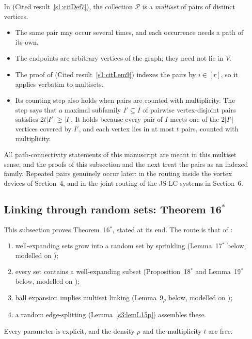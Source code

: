 \begin{remark}\label{s3:remMultiset}
In \cite[Definition~7]{BM} (Cited result~\ref{s1:citDef7}), the collection
$\mathcal P$ is a \emph{multiset} of pairs of distinct vertices.
\begin{itemize}
\item The same pair may occur several times, and each occurrence needs a
  path of its own.
\item The endpoints are arbitrary vertices of the graph; they need not
  lie in $V$.
\item The proof of \cite[Lemma~9]{BM} (Cited result~\ref{s1:citLem9}) indexes
  the pairs by $i\in[r]$, so it applies verbatim to multisets.
\item Its counting step also holds when pairs are counted with
  multiplicity. The step says that a maximal subfamily $I'\subseteq I$ of
  pairwise vertex-disjoint pairs satisfies $2t|I'|\ge|I|$. It holds
  because every pair of $I$ meets one of the $2|I'|$ vertices covered by
  $I'$, and each vertex lies in at most $t$ pairs, counted with
  multiplicity.
\end{itemize}
All path-connectivity statements of this manuscript are meant in this
multiset sense, and the proofs of this subsection and the next treat the
pairs as an indexed family. Repeated pairs genuinely occur later: in the
routing inside the vortex devices of Section~4, and in the joint routing
of the JS-LC systems in Section~6.
\deps{\ref{s1:citDef7}, \ref{s1:citLem9}}
\end{remark}

\subsection{Linking through random sets: Theorem 16\texorpdfstring{$^*$}{*}}

This subsection proves Theorem~16$^*$, stated at its end. The route is
that of \cite[Section~4]{BM}:
\begin{enumerate}
\item well-expanding sets grow into a random set by sprinkling
  (Lemma~17$^*$ below, modelled on \cite[Lemma~17]{BM});
\item every set contains a well-expanding subset (Proposition~18$^*$
  and Lemma~19$^*$ below, modelled on \cite[Proposition~18 and
  Lemma~19]{BM});
\item ball expansion implies multiset linking (Lemma~9$_\rho$ below,
  modelled on \cite[Lemma~9]{BM});
\item a random edge-splitting (Lemma~\ref{s3:lemL15p}) assembles these.
\end{enumerate}
Every parameter is explicit, and the density $\rho$ and the multiplicity
$t$ are free.

